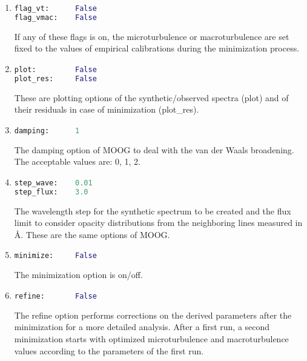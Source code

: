 \documentclass[a4paper,10pt]{article}
\begin{document}
\begin{enumerate}
\item
\begin{lstlisting}[language=Python]
flag_vt:      False
flag_vmac:    False
\end{lstlisting}
If any of these flags is on, the microturbulence or macroturbulence are set fixed to the values of empirical calibrations during the minimization process.

\item
\begin{lstlisting}[language=Python]
plot:         False
plot_res:     False
\end{lstlisting}
These are plotting options of the synthetic/observed spectra (plot) and of their residuals in case of minimization (plot\_res).

\item
\begin{lstlisting}[language=Python]
damping:      1
\end{lstlisting}
The damping option of MOOG to deal with the van der Waals broadening. The acceptable values are: 0, 1, 2.

\item
\begin{lstlisting}[language=Python]
step_wave:    0.01
step_flux:    3.0
\end{lstlisting}
The wavelength step for the synthetic spectrum to be created and the flux limit to consider opacity distributions from the neighboring lines measured in \AA{}. These are the same options of MOOG.

\item
\begin{lstlisting}[language=Python]
minimize:     False
\end{lstlisting}
The minimization option is on/off.

\item
\begin{lstlisting}[language=Python]
refine:       False
\end{lstlisting}
The refine option performs corrections on the derived parameters after the minimization for a more detailed analysis. After a first run, a second minimization starts with optimized
microturbulence and macroturbulence values according to the parameters of the first run.


\end{enumerate}
\end{document}
